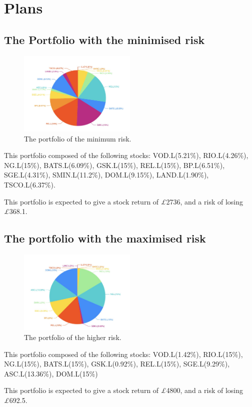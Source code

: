 

\section{Plans}

\subsection{The Portfolio with the minimised risk}

\begin{figure}[!h]
\centering
\includegraphics[width=0.5\textwidth]{./Figures/minimum risk.jpg}
\caption{The portfolio of the minimum risk.}
\end{figure}

This portfolio composed of the following stocks: VOD.L(5.21\%), RIO.L(4.26\%), NG.L(15\%), BATS.L(6.09\%), GSK.L(15\%),	REL.L(15\%), BP.L(6.51\%),
SGE.L(4.31\%), SMIN.L(11.2\%), DOM.L(9.15\%), LAND.L(1.90\%), TSCO.L(6.37\%).

This portfolio is expected to give a stock return of \textit{\pounds}2736, and a risk of losing \textit{\pounds}368.1. 

\subsection{The portfolio with the maximised risk}
    
\begin{figure}[!h]
\centering
\includegraphics[width=0.5\textwidth]{./Figures/higher risk.jpg}
\caption{The portfolio of the higher risk.}
\end{figure}
    
This portfolio composed of the following stocks: 
VOD.L(1.42\%), RIO.L(15\%), NG.L(15\%), BATS.L(15\%), GSK.L(0.92\%),	REL.L(15\%), SGE.L(9.29\%), ASC.L(13.36\%), DOM.L(15\%)

This portfolio is expected to give a stock return of \textit{\pounds}4800, and a risk of losing \textit{\pounds}692.5. 

\newpage